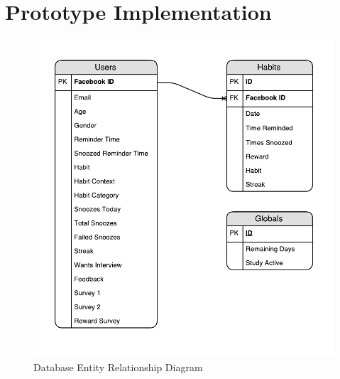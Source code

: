 
\section{Prototype Implementation}


\begin{figure}[H]
    \centering
    \includegraphics[width=5.1in]{../resources/diagrams/database-diagram.pdf}
    \caption{Database Entity Relationship Diagram}
    \label{fig:db_diagram}
\end{figure}


